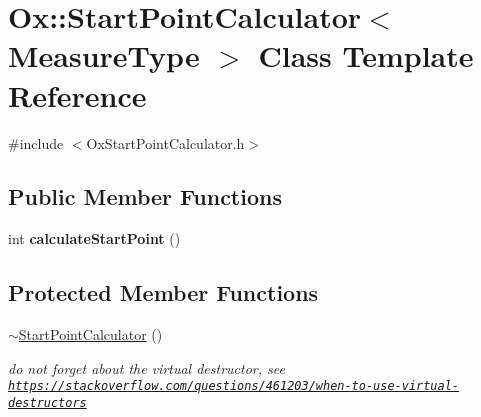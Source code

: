 \hypertarget{class_ox_1_1_start_point_calculator}{}\section{Ox\+:\+:Start\+Point\+Calculator$<$ Measure\+Type $>$ Class Template Reference}
\label{class_ox_1_1_start_point_calculator}


{\ttfamily \#include $<$Ox\+Start\+Point\+Calculator.\+h$>$}

\subsection*{Public Member Functions}
\begin{DoxyCompactItemize}
\item 
\mbox{\label{class_ox_1_1_start_point_calculator_a72104aeeb3de86524f690b323ef8c499}} 
int {\bfseries calculate\+Start\+Point} ()
\end{DoxyCompactItemize}
\subsection*{Protected Member Functions}
\begin{DoxyCompactItemize}
\item 
\mbox{\label{class_ox_1_1_start_point_calculator_a831002007694e59d67b3e56d0d570426}} 
\mbox{\hyperlink{class_ox_1_1_start_point_calculator_a831002007694e59d67b3e56d0d570426}{$\sim$\+Start\+Point\+Calculator}} ()
\begin{DoxyCompactList}\small\item\em do not forget about the virtual destructor, see \href{https://stackoverflow.com/questions/461203/when-to-use-virtual-destructors}{\tt https\+://stackoverflow.\+com/questions/461203/when-\/to-\/use-\/virtual-\/destructors} \end{DoxyCompactList}\end{DoxyCompactItemize}

